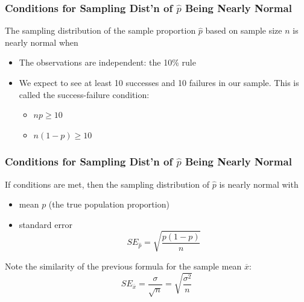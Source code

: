\documentclass[handout]{beamer}
\newcommand{\blue}[1]{\textcolor{blue2}{#1}}
\newcommand{\xbar}{\overline{x}}
\newcommand{\phat}{\widehat{p}}
\begin{document}
\begin{frame}[fragile]
\frametitle{Conditions for Sampling Dist'n of $\phat$ Being Nearly Normal}
%
%
The sampling distribution of the \blue{sample proportion} $\phat$ based on sample size $n$ is nearly normal when

\begin{itemize}
\pause \item The observations are independent:  the 10\% rule
\pause \item We expect to see at least 10 successes and 10 failures in our sample.  This is called the \blue{success-failure condition}:
\begin{itemize}
\item $np \geq 10$
\item $n(1-p) \geq 10$ 
\end{itemize}
\end{itemize}

\end{frame}


\begin{frame}[fragile]
\frametitle{Conditions for Sampling Dist'n of $\phat$ Being Nearly Normal}

%
%
If conditions are met, then the sampling distribution of $\phat$ is nearly normal with
\begin{itemize}
\item mean $p$ (the true population proportion)
\item standard error
\[
SE_{\phat} = \sqrt{\frac{p(1-p)}{n}}
\]
\end{itemize}

\pause Note the similarity of the previous formula for the sample mean $\xbar$: 
\[
SE_{\xbar} = \frac{\sigma}{\sqrt{n}} = \sqrt{\frac{\sigma^2}{n}}
\]

\end{frame}
\end{document}
